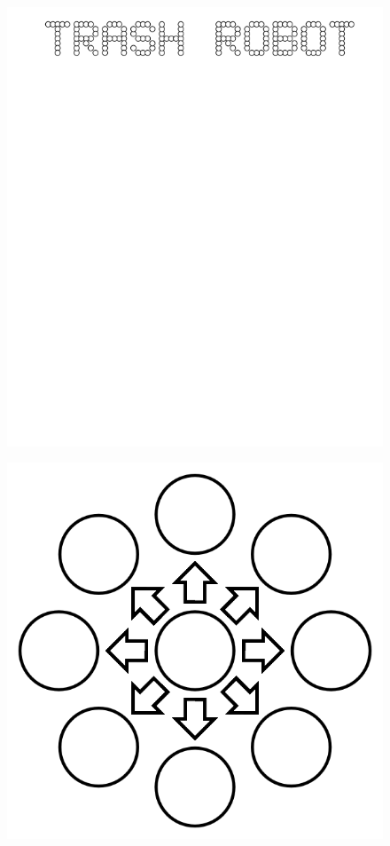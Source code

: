 \documentclass[17pt]{extreport}
\begin{document}
        \begin{figure}
		\centering
		\includegraphics[width=6.25in]{imageserver/uploadimages/trashrobot.png}
	\end{figure}

		
	\begin{figure}
		\centering
		\includegraphics[width=6.25in]{imageserver/uploadimages/image12.png}
	\end{figure}
\end{document}
